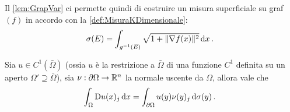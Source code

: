 Il \cref{lem:GrapVar} ci permette quindi di costruire un misura superficiale su graf$(f)$ in accordo con la \cref{def:MisuraKDimensionale}:
\begin{equation}\label{eq:MisuraSuperficialeGrafico}
	\sigma(E)=\int_{g^{-1}(E)} \sqrt{1+\lVert\nabla f(x)\rVert^2} \,\mathrm d x\, \text{. }
\end{equation}


\begin{proposition}\label{prop:FormulaStokes}
	Sia $u\in C^1(\bar \Omega)$ (ossia $u$ è la restrizione a $\bar \Omega$ di una funzione $C^1$ definita su un aperto
	$\Omega'\supseteq \bar \Omega$), sia $\nu:\partial \Omega \rightarrow \mathbb R^n$ la normale uscente da $\Omega$, allora vale che
	\begin{equation}\label{eq:FormulaStokes}
		\int_{\Omega} \mathrm D u(x)_j \,\mathrm d x = \int_{\partial \Omega} u(y)\nu(y)_j \,\mathrm d \sigma(y)\, \text{. }
	\end{equation}
\end{proposition}

